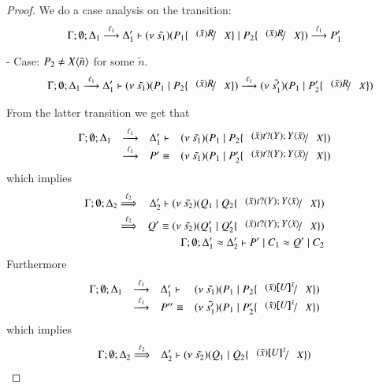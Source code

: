 \begin{proof}
	\noi We do a case analysis on the transition:
%
	\[
		\Gamma; \es; \Delta_1 \by{\ell_1} \Delta_1' \proves \newsp{\tilde{s_1}}{P_1 \subst{(\tilde{x}) R}{X} \Par P_2\subst{(\tilde{x}) R}{X} } \by{\ell_1} P_1'
	\]
%

	\noi - Case: $P_2 \not= X\langle \tilde{n} \rangle$ for some $\tilde{n}$.
%
	\begin{eqnarray*}
		&&\Gamma; \es; \Delta_1 \by{\ell_1} \Delta_1' \proves \newsp{\tilde{s_1}}{P_1 \Par P_2 \subst{(\tilde{x}) R}{X} }
		\by{\ell_1}
		\newsp{\tilde{s_1'}}{P_1 \Par P_2' \subst{(\tilde{x}) R}{X}}
	\end{eqnarray*}

	\noi From the latter transition we get that
%
\[
	\begin{array}{rcll}
		\Gamma; \es; \Delta_1 &\by{\ell_1}& \Delta_1' \proves & \newsp{\tilde{s_1}}{P_1 \Par P_2 \subst{(\tilde{x}) \binp{t}{Y} \appl{Y}{\tilde{x}}}{X}}\\
		&\by{\ell_1}&
		P' \scong & \newsp{\tilde{s_1}}{P_1 \Par P_2' \subst{(\tilde{x}) \binp{t}{Y} \appl{Y}{\tilde{x}}}{X}}
	\end{array}
\]
%
	\noi which implies
%
	\begin{eqnarray}
		\Gamma; \es; \Delta_2 &\By{\ell_2}& \Delta_2' \proves \newsp{\tilde{s_2}}{Q_1 \Par Q_2 \subst{(\tilde{x}) \binp{t}{Y} \appl{Y}{\tilde{x}}}{X}} \nonumber \\
		&\By{\ell_2}&
		Q' \scong \newsp{\tilde{s_2}}{Q_1' \Par Q_2' \subst{(\tilde{x}) \binp{t}{Y} \appl{Y}{\tilde{x}}}{X}} \label{lem:subst_equiv1}
		\\
		&&\Gamma; \es; \Delta_1' \wb \Delta_2' \proves P' \Par C_1 \wb Q' \Par C_2 \label{lem:subst_equiv2}
	\end{eqnarray}
%
	\noi Furthermore
%
\[
	\begin{array}{rcll}
		\Gamma; \es; \Delta_1 &\by{\ell_1}& \Delta_1' \proves & \newsp{\tilde{s_1}}{P_1 \Par P_2 \subst{(\tilde{x}) \map{U}^{\tilde{x}}}{X}}\\
		&\by{\ell_1}&
		P'' \scong & \newsp{\tilde{s_1'}}{P_1 \Par P_2' \subst{(\tilde{x}) \map{U}^{\tilde{x}}}{X}}
	\end{array}
\]
%
	\noi which implies
%
	\begin{eqnarray}
		\Gamma; \es; \Delta_2 &\By{\ell_2}& \Delta_2' \proves \newsp{\tilde{s_2}}{Q_1 \Par Q_2 \subst{(\tilde{x}) \map{U}^{\tilde{x}}}{X}} \nonumber \\

\end{eqnarray}
\end{proof}
